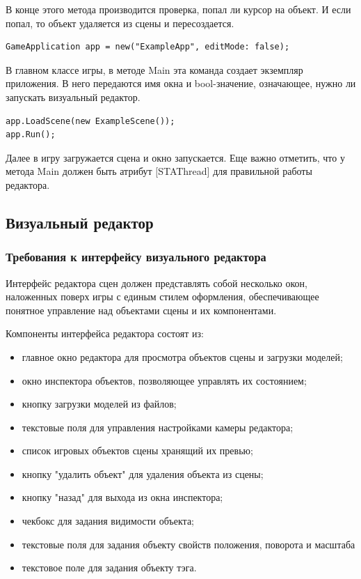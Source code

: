 В конце этого метода производится проверка, попал ли курсор на объект. И если попал, то объект удаляется из сцены и пересоздается.

\begin{lstlisting}
GameApplication app = new("ExampleApp", editMode: false);
\end{lstlisting}

В главном классе игры, в методе Main эта команда создает экземпляр приложения. В него передаются имя окна и bool-значение, означающее, нужно ли запускать визуальный редактор.

\begin{lstlisting}
app.LoadScene(new ExampleScene());
app.Run();
\end{lstlisting}

Далее в игру загружается сцена и окно запускается. Еще важно отметить, что у метода Main должен быть атрибут [STAThread] для правильной работы редактора.

\subsection{Визуальный редактор}
\subsubsection{Требования к интерфейсу визуального редактора}
Интерфейс редактора сцен должен представлять собой несколько окон, наложенных поверх игры с единым стилем оформления, обеспечивающее понятное управление над объектами сцены и их компонентами.

Компоненты интерфейса редактора состоят из:

\begin{itemize}
	\item главное окно редактора для просмотра объектов сцены и загрузки моделей;
	
	\item окно инспектора объектов, позволяющее управлять их состоянием;
	
	\item кнопку загрузки моделей из файлов;
	
	\item текстовые поля для управления настройками камеры редактора;
	
	\item список игровых объектов сцены хранящий их превью;
	
	\item кнопку "удалить объект" для удаления объекта из сцены;
	
	\item кнопку "назад" для выхода из окна инспектора;
	
	\item чекбокс для задания видимости объекта;
	
	\item текстовые поля для задания объекту свойств положения, поворота и масштаба
	
	\item текстовое поле для задания объекту тэга.
\end{itemize}

